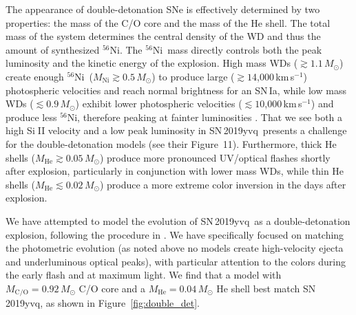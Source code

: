 \documentclass[twocolumn]{aastex63}
\def\ion#1#2{#1$\;${\footnotesize\rm{#2}}\relax}
\newcommand{\kms}{km\,s$^{-1}$}
\newcommand{\radni}{$^{56}$Ni}
\newcommand{\sn}{SN\,2019yvq}
\begin{document}
The appearance of double-detonation SNe is effectively determined by two
properties: the mass of the C/O core and the mass of the He shell. The total
mass of the system determines the central density of the WD and thus the
amount of synthesized \radni. The \radni\ mass directly controls both the peak
luminosity and the kinetic energy of the explosion. High mass WDs ($\gtrsim
1.1\,M_\odot$) create enough \radni\ ($M_\mathrm{Ni} \gtrsim 0.5\,M_\odot$) to
produce large ($\gtrsim 1$4,000\,\kms) photospheric velocities and reach
normal brightness for an SN\,Ia, while low mass WDs ($\lesssim 0.9\,M_\odot$)
exhibit lower photospheric velocities ($\lesssim 1$0,000\,\kms) and produce
less \radni, therefore peaking at fainter luminosities \citep{Polin19}. That
we see both a high \ion{Si}{II} velocity and a low peak luminosity in \sn\
presents a challenge for the \citet{Polin19} double-detonation models (see
their Figure~11). Furthermore, thick He shells ($M_\mathrm{He} \gtrsim
0.05\,M_\odot$) produce more pronounced UV/optical flashes shortly after
explosion, particularly in conjunction with lower mass WDs, while thin He
shells ($M_\mathrm{He} \lesssim 0.02\,M_\odot$) produce a more extreme color
inversion in the days after explosion.

We have attempted to model the evolution of \sn\ as a double-detonation
explosion, following the procedure in \citet{Polin19}. We have specifically
focused on matching the photometric evolution (as noted above no models create
high-velocity ejecta and underluminous optical peaks), with particular
attention to the colors during the early flash and at maximum light. We find
that a model with $M_\mathrm{C/O} = 0.92\,M_\odot$ C/O core and a
$M_\mathrm{He} = 0.04\,M_\odot$ He shell best match \sn, as shown in
Figure~\ref{fig:double_det}.
\end{document}
